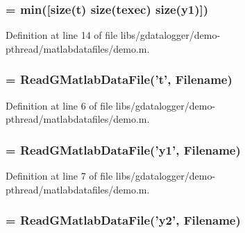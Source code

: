 \subsubsection[{N}]{ = min([size({\bf t}) size(texec) size({\bf y1})])}\label{libs_2gdatalogger_2demo-pthread_2matlabdatafiles_2demo_8m_a8cc2e7240164328fdc3f0e5e21032c56}


Definition at line 14 of file libs/gdatalogger/demo-\/pthread/matlabdatafiles/demo.m.
\subsubsection[{t}]{ = ReadGMatlabDataFile('{\bf t}', {\bf Filename})}\label{libs_2gdatalogger_2demo-pthread_2matlabdatafiles_2demo_8m_aaccc9105df5383111407fd5b41255e23}


Definition at line 6 of file libs/gdatalogger/demo-\/pthread/matlabdatafiles/demo.m.
\subsubsection[{y1}]{ = ReadGMatlabDataFile('{\bf y1}', {\bf Filename})}\label{libs_2gdatalogger_2demo-pthread_2matlabdatafiles_2demo_8m_a7f911dc1dbbc41c6cae56357e8fb2230}


Definition at line 7 of file libs/gdatalogger/demo-\/pthread/matlabdatafiles/demo.m.
\subsubsection[{y2}]{ = ReadGMatlabDataFile('{\bf y2}', {\bf Filename})}\label{libs_2gdatalogger_2demo-pthread_2matlabdatafiles_2demo_8m_a41b94b12b7cb45b3ddee299d4e7b79e8}



